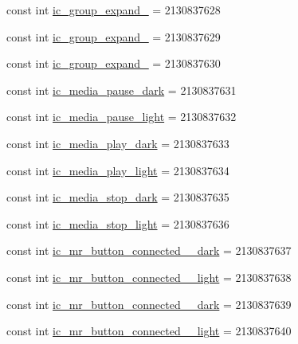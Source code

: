 \begin{CompactItemize}
\item 
const int \hyperlink{class__2doo_1_1_droid_1_1_resource_1_1_drawable_7b1771cc82610fd4630d25aeea16f4d4}{ic\_\-group\_\-expand\_} = 2130837628
\item 
const int \hyperlink{class__2doo_1_1_droid_1_1_resource_1_1_drawable_c49eedf6da9cf69145af867225df8614}{ic\_\-group\_\-expand\_} = 2130837629
\item 
const int \hyperlink{class__2doo_1_1_droid_1_1_resource_1_1_drawable_e47703f7757d5b145d46ae4a11abef71}{ic\_\-group\_\-expand\_} = 2130837630
\item 
const int \hyperlink{class__2doo_1_1_droid_1_1_resource_1_1_drawable_1b208ac9e9478d8363752ce25385f2b9}{ic\_\-media\_\-pause\_\-dark} = 2130837631
\item 
const int \hyperlink{class__2doo_1_1_droid_1_1_resource_1_1_drawable_8607acd675372c028e44264cf9f2f7e8}{ic\_\-media\_\-pause\_\-light} = 2130837632
\item 
const int \hyperlink{class__2doo_1_1_droid_1_1_resource_1_1_drawable_0c6ac00603b6deb96f8feb473de048ba}{ic\_\-media\_\-play\_\-dark} = 2130837633
\item 
const int \hyperlink{class__2doo_1_1_droid_1_1_resource_1_1_drawable_c653fdb30d696eb8d17d5ca1efd9a503}{ic\_\-media\_\-play\_\-light} = 2130837634
\item 
const int \hyperlink{class__2doo_1_1_droid_1_1_resource_1_1_drawable_6b55e6966090170f9224a277ba1c7e25}{ic\_\-media\_\-stop\_\-dark} = 2130837635
\item 
const int \hyperlink{class__2doo_1_1_droid_1_1_resource_1_1_drawable_dab161de5258746bf2935559dfb83c4d}{ic\_\-media\_\-stop\_\-light} = 2130837636
\item 
const int \hyperlink{class__2doo_1_1_droid_1_1_resource_1_1_drawable_811193e77b9992093323f3c11ef790c6}{ic\_\-mr\_\-button\_\-connected\_\_\-dark} = 2130837637
\item 
const int \hyperlink{class__2doo_1_1_droid_1_1_resource_1_1_drawable_1b0f086c0f402f167eb75201f24cb180}{ic\_\-mr\_\-button\_\-connected\_\_\-light} = 2130837638
\item 
const int \hyperlink{class__2doo_1_1_droid_1_1_resource_1_1_drawable_fd40106ccaec91239dfd32f786086704}{ic\_\-mr\_\-button\_\-connected\_\_\-dark} = 2130837639
\item 
const int \hyperlink{class__2doo_1_1_droid_1_1_resource_1_1_drawable_cd98e96961caf9a050f6ca7eeadd7500}{ic\_\-mr\_\-button\_\-connected\_\_\-light} = 2130837640
\item 

\end{CompactItemize}
